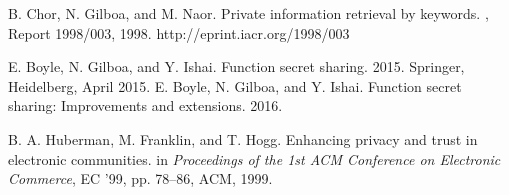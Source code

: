 \documentclass[11pt]{article} %
\begin{document}
\begin{thebibliography}{10}
\begin{small}
 B. Chor, N. Gilboa, and M. Naor. \newblock Private information retrieval by keywords. , Report 1998/003, 1998. http://eprint.iacr.org/1998/003

 E. Boyle, N. Gilboa, and Y. Ishai. \newblock Function secret sharing.  2015.
Springer, Heidelberg, April 2015.
 E. Boyle, N. Gilboa, and Y. Ishai. \newblock Function secret sharing: Improvements and extensions.  2016.

  B. A. Huberman, M. Franklin, and T. Hogg. \newblock Enhancing privacy and trust in electronic communities. \newblock in
{\em Proceedings of the 1st ACM Conference on Electronic Commerce}, EC ’99, pp. 78–86, ACM, 1999.




\end{small}
\end{thebibliography}

 
\end{document}
